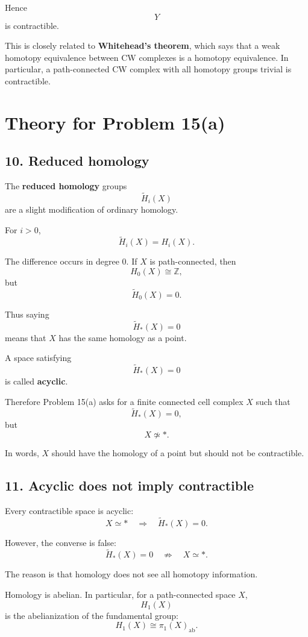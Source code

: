 \documentclass[12pt,a4paper]{article}
\theoremstyle{notespace}
\begin{document}
Hence
\[
Y
\]
is contractible.

This is closely related to \textbf{Whitehead's theorem}, which says that a weak homotopy equivalence between CW complexes is a homotopy equivalence. In particular, a path-connected CW complex with all homotopy groups trivial is contractible.

\section*{Theory for Problem 15(a)}

\subsection*{10. Reduced homology}

The \textbf{reduced homology} groups
\[
\widetilde H_i(X)
\]
are a slight modification of ordinary homology.

For \(i>0\),
\[
\widetilde H_i(X)=H_i(X).
\]

The difference occurs in degree \(0\). If \(X\) is path-connected, then
\[
H_0(X)\cong \mathbb Z,
\]
but
\[
\widetilde H_0(X)=0.
\]

Thus saying
\[
\widetilde H_*(X)=0
\]
means that \(X\) has the same homology as a point.

A space satisfying
\[
\widetilde H_*(X)=0
\]
is called \textbf{acyclic}.

Therefore Problem 15(a) asks for a finite connected cell complex \(X\) such that
\[
\widetilde H_*(X)=0,
\]
but
\[
X\not\simeq *.
\]

In words, \(X\) should have the homology of a point but should not be contractible.

\subsection*{11. Acyclic does not imply contractible}

Every contractible space is acyclic:
\[
X\simeq *
\quad\Longrightarrow\quad
\widetilde H_*(X)=0.
\]

However, the converse is false:
\[
\widetilde H_*(X)=0
\quad
\not\Longrightarrow
\quad
X\simeq *.
\]

The reason is that homology does not see all homotopy information.

Homology is abelian. In particular, for a path-connected space \(X\),
\[
H_1(X)
\]
is the abelianization of the fundamental group:
\[
H_1(X)\cong \pi_1(X)_{\mathrm{ab}}.
\]
\end{document}
